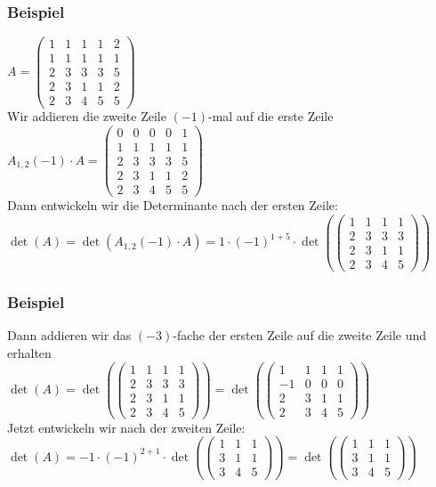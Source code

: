 \begin{frame}\frametitle{Beispiel}
$A=\begin{pmatrix} 1&1&1&1&2 \\ 1&1&1&1&1 \\ 2&3&3&3&5 \\ 2&3&1&1&2 \\ 2&3&4&5&5 \end{pmatrix}$\\\pause\vfill
Wir addieren die zweite Zeile $(-1)$-mal auf die erste Zeile\\\vfill
$A_{1,2}(-1)\cdot A=\begin{pmatrix} 0&0&0&0&1 \\ 1&1&1&1&1 \\ 2&3&3&3&5 \\ 2&3&1&1&2 \\ 2&3&4&5&5 \end{pmatrix}$\\\pause\vfill
Dann entwickeln wir die Determinante nach der ersten Zeile:
$\det(A)=\det(A_{1,2}(-1)\cdot A)=1\cdot(-1)^{1+5}\cdot \det(\begin{pmatrix}  1&1&1&1\\ 2&3&3&3 \\ 2&3&1&1 \\ 2&3&4&5 \end{pmatrix})$

\end{frame}
%
%
\begin{frame}\frametitle{Beispiel}
Dann addieren wir das $(-3)$-fache der ersten Zeile auf die zweite Zeile und erhalten\\
$\det(A)=\det(\begin{pmatrix}  1&1&1&1\\ 2&3&3&3 \\ 2&3&1&1 \\ 2&3&4&5 \end{pmatrix})=\det(\begin{pmatrix}  1&1&1&1\\ -1&0&0&0 \\ 2&3&1&1 \\ 2&3&4&5 \end{pmatrix})$\\\pause
\vfill Jetzt entwickeln wir nach der zweiten Zeile:\\\vfill
$\det(A)=-1\cdot(-1)^{2+1}\cdot\det(\begin{pmatrix} 1&1&1 \\ 3&1&1 \\ 3&4&5\end{pmatrix})=\det(\begin{pmatrix} 1&1&1 \\ 3&1&1 \\ 3&4&5\end{pmatrix})$
\end{frame}
